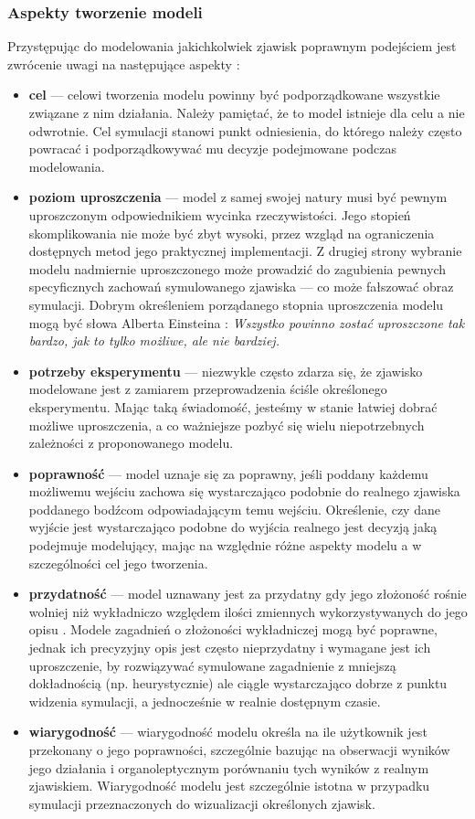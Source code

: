 \subsubsection{Aspekty tworzenie modeli}
\par{
Przystępując do modelowania jakichkolwiek zjawisk poprawnym podejściem jest zwrócenie uwagi na następujące aspekty \cite{KotowskiTronczyk}:
\begin{itemize}
\item \textbf{cel} --- celowi tworzenia modelu powinny być podporządkowane wszystkie związane z nim działania. Należy pamiętać, że to model istnieje dla celu a nie odwrotnie. Cel symulacji stanowi punkt odniesienia, do którego należy często powracać i podporządkowywać mu decyzje podejmowane podczas modelowania.
\item \textbf{poziom uproszczenia} --- model z samej swojej natury musi być pewnym uproszczonym odpowiednikiem wycinka rzeczywistości. Jego stopień skomplikowania nie może być zbyt wysoki, przez wzgląd na ograniczenia dostępnych metod jego praktycznej implementacji. Z drugiej strony wybranie modelu nadmiernie uproszczonego może prowadzić do zagubienia pewnych specyficznych zachowań symulowanego zjawiska --- co może fałszować obraz symulacji. Dobrym określeniem porządanego stopnia uproszczenia modelu mogą być słowa Alberta Einsteina \cite{Wplyw}: \textit{Wszystko powinno zostać uproszczone tak bardzo, jak to tylko możliwe, ale nie bardziej.}
\item \textbf{potrzeby eksperymentu} --- niezwykle często zdarza się, że zjawisko modelowane jest z zamiarem przeprowadzenia ściśle określonego eksperymentu. Mając taką świadomość, jesteśmy w stanie łatwiej dobrać możliwe uproszczenia, a co ważniejsze pozbyć się wielu niepotrzebnych zależności z proponowanego modelu.
\item \textbf{poprawność} --- model uznaje się za poprawny, jeśli poddany każdemu możliwemu wejściu zachowa się wystarczająco podobnie do realnego zjawiska poddanego bodźcom odpowiadającym temu wejściu. Określenie, czy dane wyjście jest wystarczająco podobne do wyjścia realnego jest decyzją jaką podejmuje modelujący, mając na względnie różne aspekty modelu a w szczególności cel jego tworzenia.
\item \textbf{przydatność} --- model uznawany jest za przydatny gdy jego złożoność rośnie wolniej niż wykładniczo względem ilości zmiennych wykorzystywanych do jego opisu \cite{KotowskiTronczyk}. Modele zagadnień o złożoności wykładniczej mogą być poprawne, jednak ich precyzyjny opis jest często nieprzydatny i wymagane jest ich uproszczenie, by rozwiązywać symulowane zagadnienie z mniejszą dokładnością (np. heurystycznie) ale ciągle wystarczająco dobrze z punktu widzenia symulacji, a jednocześnie w realnie dostępnym czasie.
\item \textbf{wiarygodność} --- wiarygodność modelu określa na ile użytkownik jest przekonany o jego poprawności, szczególnie bazując na obserwacji wyników jego działania i organoleptycznym porównaniu tych wyników z realnym zjawiskiem. Wiarygodność modelu jest szczególnie istotna w przypadku symulacji przeznaczonych do wizualizacji określonych zjawisk.
\end{itemize}
}

